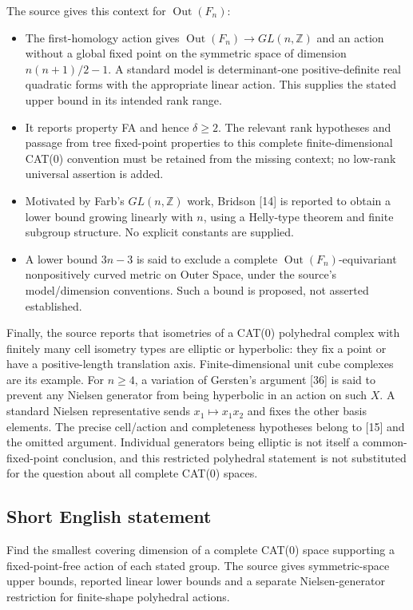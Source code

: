 \documentclass[11pt]{article}
\newcommand{\Z}{\mathbb{Z}}
\begin{document}
The source gives this context for \(\operatorname{Out}(F_n)\):
\begin{itemize}
\item The first-homology action gives \(\operatorname{Out}(F_n)\to GL(n,\Z)\) and an action without a global fixed point on the symmetric space of dimension \(n(n+1)/2-1\). A standard model is determinant-one positive-definite real quadratic forms with the appropriate linear action. This supplies the stated upper bound in its intended rank range.
\item It reports property FA and hence \(\delta\geq2\). The relevant rank hypotheses and passage from tree fixed-point properties to this complete finite-dimensional CAT(0) convention must be retained from the missing context; no low-rank universal assertion is added.
\item Motivated by Farb's \(GL(n,\Z)\) work, Bridson [14] is reported to obtain a lower bound growing linearly with \(n\), using a Helly-type theorem and finite subgroup structure. No explicit constants are supplied.
\item A lower bound \(3n-3\) is said to exclude a complete \(\operatorname{Out}(F_n)\)-equivariant nonpositively curved metric on Outer Space, under the source's model/dimension conventions. Such a bound is proposed, not asserted established.
\end{itemize}
Finally, the source reports that isometries of a CAT(0) polyhedral complex with finitely many cell isometry types are elliptic or hyperbolic: they fix a point or have a positive-length translation axis. Finite-dimensional unit cube complexes are its example. For \(n\geq4\), a variation of Gersten's argument [36] is said to prevent any Nielsen generator from being hyperbolic in an action on such \(X\). A standard Nielsen representative sends \(x_1\mapsto x_1x_2\) and fixes the other basis elements. The precise cell/action and completeness hypotheses belong to [15] and the omitted argument. Individual generators being elliptic is not itself a common-fixed-point conclusion, and this restricted polyhedral statement is not substituted for the question about all complete CAT(0) spaces.
\subsection{Short English statement}
Find the smallest covering dimension of a complete CAT(0) space supporting a fixed-point-free action of each stated group. The source gives symmetric-space upper bounds, reported linear lower bounds and a separate Nielsen-generator restriction for finite-shape polyhedral actions.
\end{document}
